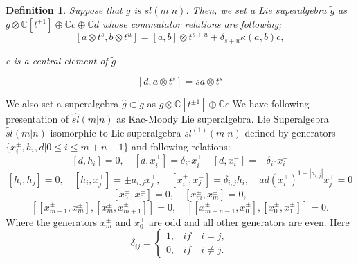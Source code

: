 \documentclass[english]{elsarticle}
\newtheorem{definition}{Definition}[section]
\numberwithin{equation}{section}
\begin{document}
\begin{definition}

 Suppose that $g$ is $sl(m|n)$. Then, we set a Lie superalgebra $\tilde{g}$ as $g\otimes \mathbb{C}[t^{\pm 1}]\oplus\mathbb{C}c\oplus\mathbb{C}d$ whose commutator relations are following;
\[
[a\otimes t^s,b\otimes t^u]=[a,b]\otimes t^{s+u}+\delta_{s+u}\kappa(a,b)c,
\]
\begin{center}
{c is a central element of $\tilde{g}$}
\end{center}
\[
[d,a\otimes t^s]=sa\otimes t^s
\]
\end{definition}
We also set a superalgebra $\hat{g} \subset \tilde{g}$ as $g\otimes\mathbb{C}[t^{\pm 1}]\oplus\mathbb{C}c$
We have following presentation of $\hat{sl}(m|n)$ as Kac-Moody Lie superalgebra.
Lie Superalgebra $\tilde{sl}(m|n)$ isomorphic to Lie superalgebra $sl^{(1)}(m|n)$ defined by generators $\{x_i^{\pm},h_i,d|0\leq i \leq m+n-1\}$ and following relations:
\[
[d,h_i]=0,\quad [d,x_i^+]=\delta_{i0}x_i^+\quad [d,x_i^-]=-\delta_{i0}x_i^-
\]
\begin{equation}
\label{eq:2}
[h_i,h_j]=0, \quad [h_i,x_j^{\pm}]=\pm a_{i,j}x_j^{\pm}, \quad [x_i^+,x_j^-]=\delta_{i,j}h_i, \quad ad(x_i^{\pm})^{1+|a_{i,j}|}x_j^{\pm}=0
\end{equation}
\begin{equation}
\label{eq:3}
[x_0^{\pm},x_0^{\pm}]=0, \quad [x_m^{\pm},x_m^{\pm}]=0,
\end{equation}
\begin{equation}
\label{eq:4}
[[x_{m-1}^{\pm},x_{m}^{\pm}],[x_{m}^{\pm},x_{m+1}^{\pm}]] = 0,\quad [[x_{m+n-1}^{\pm},x_{0}^{\pm}], [x_{0}^{\pm},x_{1}^{\pm}]] = 0.
\end{equation}
Where the generators $x_m^{\pm}$ and $x_0^{\pm}$ are odd and all other generators are even.
Here
\begin{equation}
\delta_{ij} = \begin{cases}
    1, & if \quad i=j,\\
    0, & if \quad i \neq j.
    \end{cases}
\end{equation}
\end{document}
